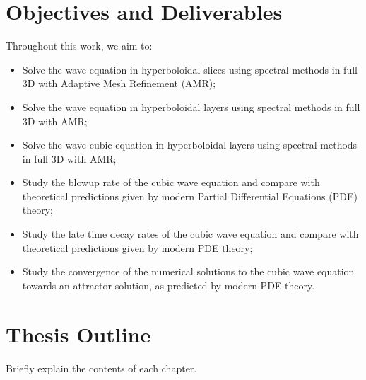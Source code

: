 \section{Objectives and Deliverables}
\label{section:objectives}

Throughout this work, we aim to:

\begin{itemize}
    \item Solve the wave equation in hyperboloidal slices using spectral methods in full 3D with Adaptive Mesh Refinement (AMR);
    
    \item Solve the wave equation in hyperboloidal layers using spectral methods in full 3D with AMR;
    
    \item Solve the wave cubic equation in hyperboloidal layers using spectral methods in full 3D with AMR;

    \item Study the blowup rate of the cubic wave equation and compare with theoretical predictions given by modern Partial Differential Equations (PDE) theory;

    \item Study the late time decay rates of the cubic wave equation and compare with theoretical predictions given by modern PDE theory;
    
    \item Study the convergence of the numerical solutions to the cubic wave equation towards an attractor solution, as predicted by modern PDE theory.
\end{itemize}


\section{Thesis Outline}
\label{section:outline}

Briefly explain the contents of each chapter.
